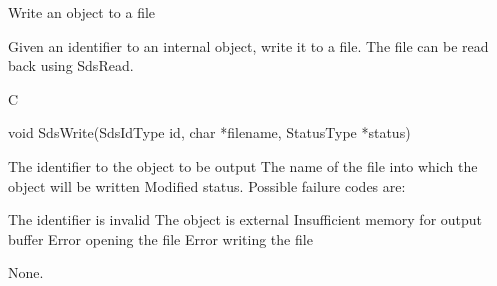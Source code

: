 \begin{manroutinedescription}
      Write an {} object to a file

      Given an identifier to an internal {} object, write it to
      a file. The file can be read back using SdsRead.
 
      C

      void SdsWrite(SdsIdType id, char *filename, StatusType *status)
 
\begin{manparametertable}
  The identifier to the object %
to be output
 The name of the file into %
which the object
                              will be written
 Modified status. Possible %
failure codes are:
\end{manparametertable}
\begin{mantwocolumntable}
The identifier is invalid
The object is external
Insufficient memory for output %
buffer
Error opening the file
Error writing the file
\end{mantwocolumntable}
      None.

\end{manroutinedescription}


